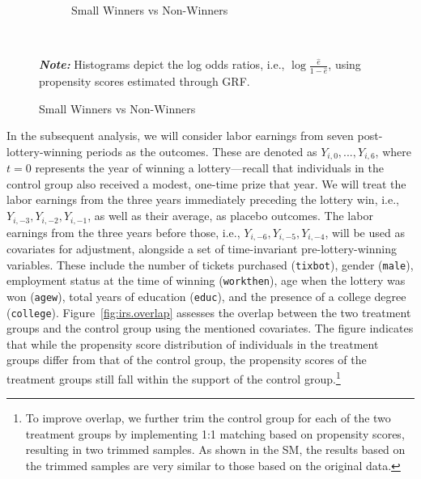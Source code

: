 \documentclass[letterpaper,12pt,leqno]{article}
\begin{document}
\begin{figure}[!ht]
\begin{minipage}[c]{.9\linewidth}
\begin{subfigure}{0.45\linewidth}
            \caption{Small Winners vs Non-Winners}
        \end{subfigure}
    \end{minipage}%
    \\\raggedright
     {\footnotesize\textbf{\textit{Note:}} Histograms depict the log odds ratios, i.e., $\log\frac{\hat{e}}{1-\hat{e}}$, using propensity scores estimated through GRF. }
\end{figure}


In the subsequent analysis, we will consider labor earnings from seven post-lottery-winning periods as the outcomes. These are denoted as $Y_{i, 0}, ..., Y_{i, 6}$, where $t=0$ represents the year of winning a lottery---recall that individuals in the control group also received a modest, one-time prize that year. We will treat the labor earnings from the three years immediately preceding the lottery win, i.e., $Y_{i,-3}, Y_{i,-2}, Y_{i,-1}$, as well as their average, as placebo outcomes. The labor earnings from the three years before those, i.e., $Y_{i,-6}, Y_{i,-5}, Y_{i,-4}$, will be used as covariates for adjustment, alongside a set of time-invariant pre-lottery-winning variables. These include the number of tickets purchased (\texttt{tixbot}), gender (\texttt{male}), employment status at the time of winning (\texttt{workthen}), age when the lottery was won (\texttt{agew}), total years of education (\texttt{educ}), and the presence of a college degree (\texttt{college}). Figure~\ref{fig:irs.overlap} assesses the overlap between the two treatment groups and the control group using the mentioned covariates. The figure indicates that while the propensity score distribution of individuals in the treatment groups differ from that of the control group, the propensity scores of the treatment groups still fall within the support of the control group.\footnote{To improve overlap, we further trim the control group for each of the two treatment groups by implementing 1:1 matching based on propensity scores, resulting in two trimmed samples. As shown in the SM, the results based on the trimmed samples are very similar to those based on the original data.}
\end{document}
